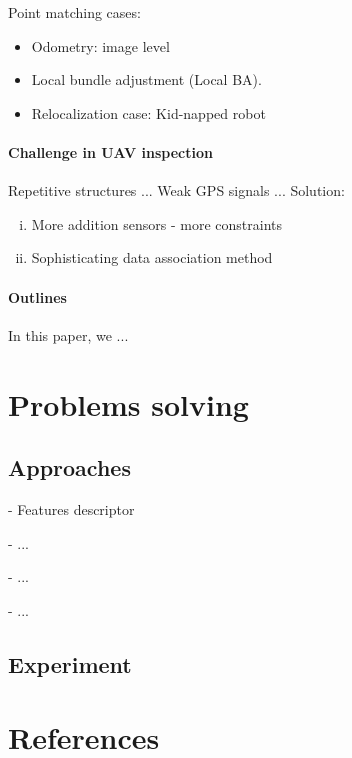 \documentclass[review]{elsarticle}
\begin{document}
Point matching cases:
\begin{itemize}
	\item Odometry: image level
	\item Local bundle adjustment (Local BA).
	\item Relocalization case: Kid-napped robot
\end{itemize}

\paragraph{Challenge in UAV inspection} 
Repetitive structures ...
Weak GPS signals ...
Solution: 
\begin{enumerate}[(i)]
	\item More addition sensors - more constraints
	\item Sophisticating data association method
\end{enumerate}

\paragraph{Outlines} 
In this paper, we ...

\section{Problems solving}

\subsection{Approaches}
- Features descriptor

- ...

- ...

- ...

\subsection{Experiment}



\section*{References}

% 
\end{document}
